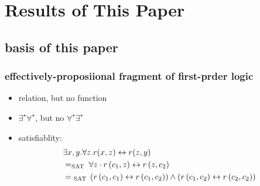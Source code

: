 \section{Results of This Paper}
\subsection{basis of this paper}
\begin{frame}
    \frametitle{effectively-proposiional fragment of first-prder logic}
    \begin{itemize}
        \item relation, but no function
        \item $\exists^{\star} \forall ^{\star}$, but no $\forall^{\star} \exists ^{\star}$
        \item satisfiablity:
        \begin{align}
            &\exists x, y . \forall z . r(x, z) \leftrightarrow r(z, y) \notag\\
            & = _{\text {SAT }} \forall z \cdot r\left(c_{1}, z\right) \leftrightarrow r\left(z, c_{2}\right) \notag\\
            & = { }_{\text {SAT }}\left(r\left(c_{1}, c_{1}\right) \leftrightarrow r\left(c_{1}, c_{2}\right)\right) \wedge\left(r\left(c_{1}, c_{2}\right) \leftrightarrow r\left(c_{2}, c_{2}\right)\right)
        \end{align}
    \end{itemize}
\end{frame}